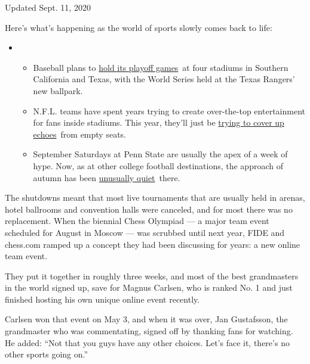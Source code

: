 Updated Sept. 11, 2020

Here's what's happening as the world of sports slowly comes back to
life:

\begin{itemize}
\item
  \begin{itemize}
  \tightlist
  \item
    Baseball plans to
    \href{https://www.nytimes3xbfgragh.onion/2020/09/10/sports/baseball/mlb-postseason-neutral-sites.html?action=click\&pgtype=Article\&state=default\&region=MAIN_CONTENT_2\&context=storylines_keepup}{hold
    its playoff games}~at four stadiums in Southern California and
    Texas, with the World Series held at the Texas Rangers' new
    ballpark.
  \item
    N.F.L. teams have spent years trying to create over-the-top
    entertainment for fans inside stadiums. This year, they'll just be
    \href{https://www.nytimes3xbfgragh.onion/2020/09/10/sports/football/what-will-nfl-games-sound-like.html?action=click\&pgtype=Article\&state=default\&region=MAIN_CONTENT_2\&context=storylines_keepup}{trying
    to cover up echoes}~from empty seats.
  \item
    September Saturdays at Penn State are usually the apex of a week of
    hype. Now, as at other college football destinations, the approach
    of autumn has been
    \href{https://www.nytimes3xbfgragh.onion/2020/09/09/sports/penn-state-college-football-canceled.html?action=click\&pgtype=Article\&state=default\&region=MAIN_CONTENT_2\&context=storylines_keepup}{unusually
    quiet}~there.
  \end{itemize}
\end{itemize}

The shutdowns meant that most live tournaments that are usually held in
arenas, hotel ballrooms and convention halls were canceled, and for most
there was no replacement. When the biennial Chess Olympiad --- a major
team event scheduled for August in Moscow --- was scrubbed until next
year, FIDE and chess.com ramped up a concept they had been discussing
for years: a new online team event.

They put it together in roughly three weeks, and most of the best
grandmasters in the world signed up, save for Magnus Carlsen, who is
ranked No. 1 and just finished hosting his own unique online event
recently.

Carlsen won that event on May 3, and when it was over, Jan Gustafsson,
the grandmaster who was commentating, signed off by thanking fans for
watching. He added: ``Not that you guys have any other choices. Let's
face it, there's no other sports going on.''

